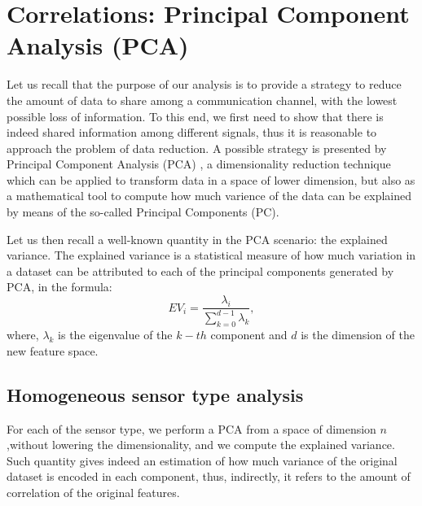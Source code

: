 \documentclass[10pt, a4paper, twocolumn]{article}
\theoremstyle{definition}
\begin{document}
\section{Correlations: Principal Component Analysis (PCA)}
Let us recall that the purpose of our analysis is to provide a strategy to reduce the amount of data to share among a communication channel, with the lowest possible loss of information. To this end, we first need to show that there is indeed shared information among different signals, thus it is reasonable to approach the problem of data reduction. A possible strategy is presented by Principal Component Analysis (PCA) \cite{Jolliffe2011}, a dimensionality reduction technique which can be applied to transform data in a space of lower dimension, but also as a mathematical tool to compute how much varience of the data can be explained by means of the so-called Principal Components (PC). \par
Let us then recall a well-known quantity in the PCA scenario: the explained variance. The explained variance is a statistical measure of how much variation in a dataset can be attributed to each of the principal components generated by PCA, in the formula:
\begin{equation}
EV_i = \frac{\lambda_i}{\sum_{k=0}^{d-1}\lambda_k} ,
\end{equation}
where, $\lambda_k$ is the eigenvalue of the $k-th$ component and $d$ is the dimension of the new feature space.

\subsection{Homogeneous sensor type analysis}

For each of the sensor type, we perform a PCA \cite{sklearn_api} from a space of dimension $n$ ,without lowering the dimensionality, and we compute the explained variance. Such quantity gives indeed an estimation of how much variance of the original dataset is encoded in each component, thus, indirectly, it refers to the amount of correlation of the original features. 
\end{document}
